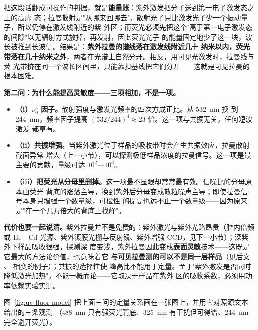 把这段话翻成可操作的判据，就是\textbf{能量账}：紫外激发把分子送到第一电子激发态之上的高虚
态；拉曼散射是"从哪来回哪去"，散射光子只比激发光子少一个振动量子，所以仍停在激发线附近的紫
外区；而荧光必须先把这个"高于第一电子激发态的间隙"以无辐射方式放掉，再发射，因此荧光光子
的能量固定地少了这一块，波长被推到长波侧。结果是：\textbf{紫外拉曼的谱线落在激发线附近几十
纳米以内，荧光带落在几十纳米之外}，两者在光谱上自然分开。相反，用可见光激发时，拉曼线与荧
光带挤在同一个波长区间里，只能靠扣基线把它们分开——这就是可见拉曼的根本困难。

\textbf{第二问：为什么能提高灵敏度——三项相加，不是一项。}

\begin{itemize}
\item \textbf{（i）$\nu_0^4$ 因子。}散射强度与激发光频率的四次方成正比。从 \qty{532}{nm} 换
  到 \qty{244}{nm}，频率因子提高 $(532/244)^4\approx 23$ 倍。这一项与共振无关，任何短波激发
  都享有。
\item \textbf{（ii）共振增强。}当紫外激光位于样品的吸收带时会产生共振效应，拉曼散射截面异常
  增大（上一小节），可以探测极低样品浓度的拉曼信号。这一项是最主要的贡献，量级可达
  $10^2$—$10^6$。
\item \textbf{（iii）把荧光从分母里删掉。}这一项最不显眼却常常最有效。信噪比的分母原本由荧光
  背底的涨落主导，换到紫外后分母变成散粒噪声主导；即使拉曼信号本身只增强一个数量级，可检性
  的提高也远不止一个数量级——因为原来是"在一个几万倍大的背底上找峰"。
\end{itemize}

\textbf{代价也要一起说清。}紫外拉曼并不是免费的：紫外激光与紫外光路昂贵（腔内倍频或
He—Cd 光源、紫外镀膜光栅与反射镜、紫外增强 CCD，见下一小节）；深紫外下样品吸收很强，探测深
度变浅，紫外拉曼因此变成\textbf{表面灵敏}技术——这既是它最大的方法论价值，也意味着\textbf{它
与可见拉曼测的可以不是同一层样品}（见后文 、 相变的例子）；共振的选择性使
峰高比不能用于定量。至于"紫外激发是否同时降低激光加热"，不能一概而论——它取决于样品在紫外
区的吸收系数，必须用功率依赖实验实测。

图~\ref{fig:uv-fluor-model} 把上面三问的定量关系画在一张图上，并用它对照源文本给出的三条观测
（\qty{488}{nm} 只有强荧光背底、\qty{325}{nm} 有干扰但可得谱、\qty{244}{nm} 完全避开荧光）。

